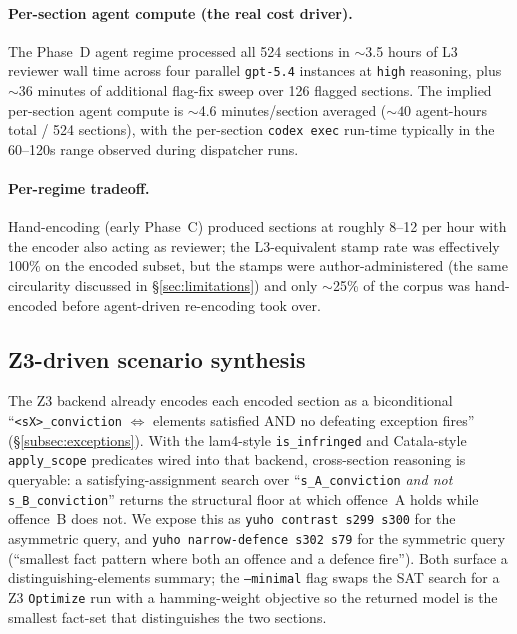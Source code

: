 \paragraph{Per-section agent compute (the real cost driver).} The
Phase~D agent regime processed all 524 sections in $\sim$3.5 hours of
L3 reviewer wall time across four parallel \texttt{gpt-5.4} instances
at \texttt{high} reasoning, plus $\sim$36 minutes of additional
flag-fix sweep over 126 flagged sections. The implied per-section
agent compute is $\sim$4.6 minutes/section averaged
(${\sim}40$ agent-hours total / 524 sections), with the per-section
\texttt{codex exec} run-time typically in the 60--120s range
observed during dispatcher runs.

\paragraph{Per-regime tradeoff.} Hand-encoding (early Phase~C) produced
sections at roughly 8--12 per hour with the encoder also acting as
reviewer; the L3-equivalent stamp rate was effectively 100\% on the
encoded subset, but the stamps were author-administered (the same
circularity discussed in \S\ref{sec:limitations}) and only
$\sim$25\% of the corpus was hand-encoded before agent-driven
re-encoding took over.

\subsection{Z3-driven scenario synthesis}
\label{subsec:scenario_synthesis}

The Z3 backend already encodes each encoded section as a
biconditional ``\texttt{<sX>\_conviction} $\Leftrightarrow$
elements satisfied AND no defeating exception fires''
(\S\ref{subsec:exceptions}). With the lam4-style
\texttt{is\_infringed} and Catala-style \texttt{apply\_scope}
predicates wired into that backend, cross-section reasoning is
queryable: a satisfying-assignment search over
``\texttt{s\_A\_conviction} \emph{and not} \texttt{s\_B\_conviction}''
returns the structural floor at which offence~A holds while
offence~B does not. We expose this as
\texttt{yuho contrast s299 s300} for the asymmetric query, and
\texttt{yuho narrow-defence s302 s79} for the symmetric query
(``smallest fact pattern where both an offence and a defence
fire''). Both surface a distinguishing-elements summary; the
\texttt{--minimal} flag swaps the SAT search for a Z3
\texttt{Optimize} run with a hamming-weight objective so the
returned model is the smallest fact-set that distinguishes the
two sections.

